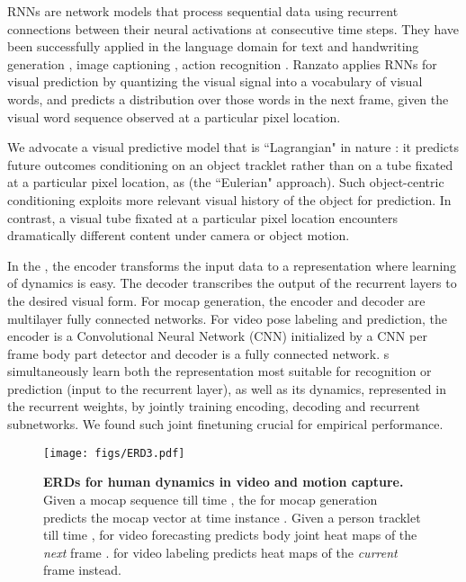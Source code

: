 \documentclass[10pt,twocolumn,letterpaper]{article}
\begin{document}
RNNs  are network models that process sequential data using recurrent connections between their neural activations at consecutive time steps.  
They have been successfully applied in the language domain for text and handwriting generation  \cite{DBLP:conf/interspeech/KombrinkMKB11,ICML2011Sutskever_524,DBLP:journals/corr/Graves13}, image captioning \cite{DBLP:journals/corr/VinyalsTBE14}, action recognition \cite{DBLP:journals/corr/DonahueHGRVSD14}.  
Ranzato  \cite{DBLP:journals/corr/RanzatoSBMCC14}  applies  RNNs for visual prediction by  quantizing the visual signal into a vocabulary of visual words, and predicts a distribution over those words in the next frame, given the visual word sequence observed at a particular  pixel location. 


We advocate a visual predictive model that is ``Lagrangian" in nature \cite{wiki}:  it predicts future outcomes conditioning on an object tracklet rather than on a tube fixated at a particular pixel location, as \cite{DBLP:journals/corr/RanzatoSBMCC14} (the ``Eulerian" approach).  Such object-centric conditioning exploits more relevant visual history of the object for prediction. In contrast, a visual tube fixated at a particular pixel location   encounters dramatically different content under camera or object motion.








In the , 
the encoder  transforms the input  data to a representation where    learning of  dynamics is easy. The decoder transcribes the output of the recurrent layers to the desired visual form.  For mocap generation, the encoder and decoder are multilayer fully connected networks. For video pose labeling and prediction, the encoder is a Convolutional Neural Network (CNN) \cite{Cun90handwrittendigit} initialized by a CNN per frame body part detector and decoder is a fully connected network.  s   simultaneously learn both the representation most suitable for recognition or prediction (input to the recurrent layer), as well as its dynamics, represented in the recurrent weights, by jointly training encoding, decoding and recurrent subnetworks. 
We found such joint finetuning crucial for empirical performance.  




\begin{figure*}[ht!]
\begin{center}
\texttt{[image: figs/ERD3.pdf]}
\end{center}
\caption{
\textbf{ERDs for human dynamics in video and motion capture.}  Given a mocap sequence till time , the   for mocap generation predicts the mocap vector at  time instance .  
Given a person tracklet till time ,   for video  forecasting  predicts body joint heat maps  of the \textit{next} frame .   for video  labeling predicts heat maps of the \textit{current} frame instead.  
}
\label{fig:autornn}
\end{figure*}
\end{document}
